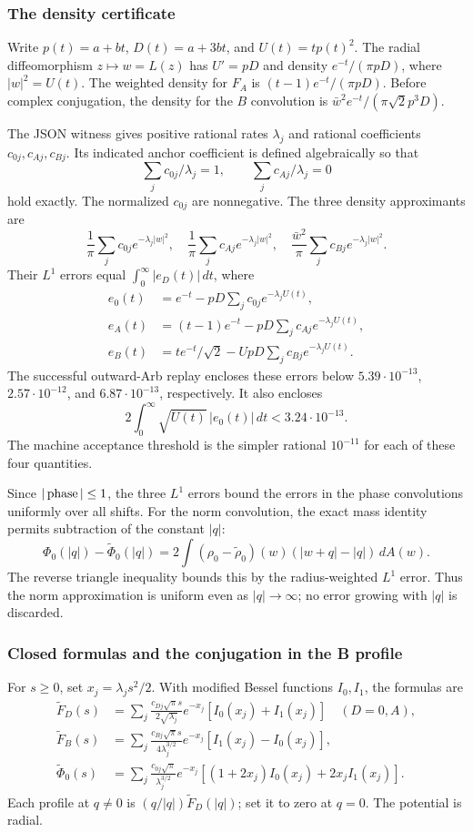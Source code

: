 \subsubsection{The density certificate}
Write $p(t)=a+bt$, $D(t)=a+3bt$, and $U(t)=tp(t)^2$.
The radial diffeomorphism $z\mapsto w=L(z)$ has $U'=pD$ and density
$e^{-t}/(\pi pD)$, where $|w|^2=U(t)$. The weighted density for $F_A$
is $(t-1)e^{-t}/(\pi pD)$. Before complex conjugation, the density
for the $B$ convolution is
$\bar w^2e^{-t}/(\pi\sqrt2p^3D)$.

The JSON witness gives positive rational rates $\lambda_j$ and rational
coefficients $c_{0j},c_{Aj},c_{Bj}$. Its indicated anchor coefficient is
defined algebraically so that
\[
 \sum_jc_{0j}/\lambda_j=1,\qquad
 \sum_jc_{Aj}/\lambda_j=0
\]
hold exactly. The normalized $c_{0j}$ are nonnegative. The three density
approximants are
\[
 \frac1\pi\sum_jc_{0j}e^{-\lambda_j|w|^2},\quad
 \frac1\pi\sum_jc_{Aj}e^{-\lambda_j|w|^2},\quad
 \frac{\bar w^2}\pi\sum_jc_{Bj}e^{-\lambda_j|w|^2}.
\]
Their $L^1$ errors equal $\int_0^\infty|e_D(t)|\,dt$, where
\begin{align*}
 e_0(t)&=e^{-t}-pD\sum_jc_{0j}e^{-\lambda_jU(t)},\\
 e_A(t)&=(t-1)e^{-t}-pD\sum_jc_{Aj}e^{-\lambda_jU(t)},\\
 e_B(t)&=te^{-t}/\sqrt2-UpD\sum_jc_{Bj}e^{-\lambda_jU(t)}.
\end{align*}
The successful outward-Arb replay encloses these errors below
$5.39\cdot10^{-13}$, $2.57\cdot10^{-12}$, and
$6.87\cdot10^{-13}$, respectively. It also encloses
\[
 2\int_0^\infty\sqrt{U(t)}\,|e_0(t)|\,dt
 <3.24\cdot10^{-13}.
\]
The machine acceptance threshold is the simpler rational $10^{-11}$
for each of these four quantities.

Since $|\operatorname{phase}|\le1$, the three $L^1$ errors bound the errors in the
phase convolutions uniformly over all shifts. For the norm convolution,
the exact mass identity permits subtraction of the constant $|q|$:
\[
 \Phi_0(|q|)-\widetilde\Phi_0(|q|)
 =2\int(\rho_0-\widetilde\rho_0)(w)
                 (|w+q|-|q|)\,dA(w).
\]
The reverse triangle inequality bounds this by the radius-weighted
$L^1$ error. Thus the norm approximation is uniform even as
$|q|\to\infty$; no error growing with $|q|$ is discarded.

\subsubsection{Closed formulas and the conjugation in the B profile}
For $s\ge0$, set $x_j=\lambda_js^2/2$. With modified Bessel functions
$I_0,I_1$, the formulas are
\begin{align*}
 \widetilde F_D(s)&=\sum_j\frac{c_{Dj}\sqrt\pi s}{2\sqrt{\lambda_j}}
       e^{-x_j}[I_0(x_j)+I_1(x_j)]\quad(D=0,A),\\
 \widetilde F_B(s)&=\sum_j\frac{c_{Bj}\sqrt\pi s}{4\lambda_j^{3/2}}
       e^{-x_j}[I_1(x_j)-I_0(x_j)],\\
 \widetilde\Phi_0(s)&=\sum_j\frac{c_{0j}\sqrt\pi}{\lambda_j^{3/2}}
       e^{-x_j}[(1+2x_j)I_0(x_j)+2x_jI_1(x_j)].
\end{align*}
Each profile at $q\ne0$ is $(q/|q|)\widetilde F_D(|q|)$; set it to
zero at $q=0$. The potential is radial.

